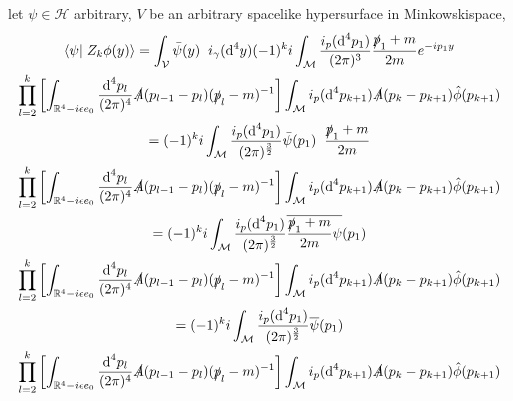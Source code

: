 \documentclass[a4paper,12pt]{article}
\begin{document}
let \(\psi \in \mathcal{H}\) arbitrary, \(V\) be an arbitrary spacelike hypersurface in Minkowskispace,
\begin{multline}
\left<\psi\right| \left. Z_k\phi(y)\right>= \int_{\mathcal{V}} \bar{\psi}(y)\hspace{0.2cm} i_{\gamma} (\text{d}^4 y) (-1)^k i  \int_{\mathcal{M}}\frac{i_p(\text{d}^4p_1)}{(2\pi)^{3}} \frac{\slashed{p}_1+m}{2m} e^{-ip_1y}  \\
  \prod_{l=2}^{k} \left[ \int_{\mathbb{R}^4-i \epsilon e_0}\frac{\text{d}^4p_l}{(2\pi)^{4}} \slashed{A}(p_{l-1}-p_l)  (\slashed{p}_l-m)^{-1}  
 \right]\int_{\mathcal{M}}  i_p(\text{d}^4p_{k+1})\slashed{A}(p_{k}-p_{k+1})\hat{\phi}(p_{k+1})\\
 =  (-1)^k i  \int_{\mathcal{M}}\frac{i_p(\text{d}^4p_1)}{(2\pi)^{\frac{3}{2}}}\bar{\psi}(p_1)\hspace{0.2cm}  \frac{\slashed{p}_1+m}{2m}   \\
  \prod_{l=2}^{k} \left[ \int_{\mathbb{R}^4-i \epsilon e_0}\frac{\text{d}^4p_l}{(2\pi)^{4}} \slashed{A}(p_{l-1}-p_l)  (\slashed{p}_l-m)^{-1}  
 \right]\int_{\mathcal{M}}  i_p(\text{d}^4p_{k+1})\slashed{A}(p_{k}-p_{k+1})\hat{\phi}(p_{k+1})\\
  =  (-1)^k i  \int_{\mathcal{M}}\frac{i_p(\text{d}^4p_1)}{(2\pi)^{\frac{3}{2}}}\overline{ \frac{\slashed{p}_1+m}{2m}\psi}(p_1)   \\
  \prod_{l=2}^{k} \left[ \int_{\mathbb{R}^4-i \epsilon e_0}\frac{\text{d}^4p_l}{(2\pi)^{4}} \slashed{A}(p_{l-1}-p_l)  (\slashed{p}_l-m)^{-1}  
 \right]\int_{\mathcal{M}}  i_p(\text{d}^4p_{k+1})\slashed{A}(p_{k}-p_{k+1})\hat{\phi}(p_{k+1})\\
   =  (-1)^k i  \int_{\mathcal{M}}\frac{i_p(\text{d}^4p_1)}{(2\pi)^{\frac{3}{2}}}\overline{\psi}(p_1)   \\
  \prod_{l=2}^{k} \left[ \int_{\mathbb{R}^4-i \epsilon e_0}\frac{\text{d}^4p_l}{(2\pi)^{4}} \slashed{A}(p_{l-1}-p_l)  (\slashed{p}_l-m)^{-1}  
 \right]\int_{\mathcal{M}}  i_p(\text{d}^4p_{k+1})\slashed{A}(p_{k}-p_{k+1})\hat{\phi}(p_{k+1})
\end{multline}
\end{document}
